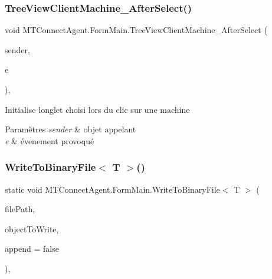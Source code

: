 \subsubsection{\texorpdfstring{Tree\+View\+Client\+Machine\+\_\+\+After\+Select()}{TreeViewClientMachine\_AfterSelect()}}
{\footnotesize\ttfamily void M\+T\+Connect\+Agent.\+Form\+Main.\+Tree\+View\+Client\+Machine\+\_\+\+After\+Select (\begin{DoxyParamCaption}\item[{object}]{sender,  }\item[{Tree\+View\+Event\+Args}]{e }\end{DoxyParamCaption})\hspace{0.3cm}{\ttfamily [inline]}, {\ttfamily [private]}}



Initialise l\textquotesingle{}onglet choisi lors du clic sur une machine 


\begin{DoxyParams}{Paramètres}
{\em sender} & objet appelant\\
\hline
{\em e} & évenement provoqué\\
\hline
\end{DoxyParams}
\mbox{\label{class_m_t_connect_agent_1_1_form_main_a6233cef0809d41ecc061bd6fa63afd5d}} 
\subsubsection{\texorpdfstring{Write\+To\+Binary\+File$<$ T $>$()}{WriteToBinaryFile< T >()}}
{\footnotesize\ttfamily static void M\+T\+Connect\+Agent.\+Form\+Main.\+Write\+To\+Binary\+File$<$ T $>$ (\begin{DoxyParamCaption}\item[{string}]{file\+Path,  }\item[{T}]{object\+To\+Write,  }\item[{bool}]{append = {\ttfamily false} }\end{DoxyParamCaption})\hspace{0.3cm}{\ttfamily [inline]}, {\ttfamily [static]}}



